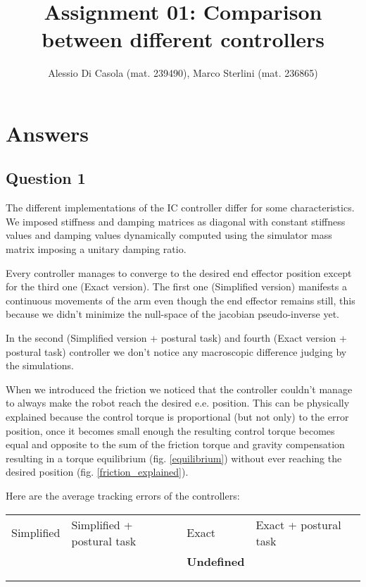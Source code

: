 \documentclass[10pt]{article}
\begin{document}
\date{}
\author{Alessio Di Casola (mat. 239490), Marco Sterlini (mat. 236865)}

\title{Assignment 01: Comparison between different controllers}

\maketitle

\section{Answers}
\subsection{Question 1}
The different implementations of the IC controller differ for some characteristics.
We imposed stiffness and damping matrices as diagonal with constant stiffness values and damping values dynamically computed using the simulator mass matrix imposing a unitary damping ratio. 

Every controller manages to converge to the desired end effector position except for the third one (Exact version). The first one (Simplified version) manifests a continuous movements of the arm even though the end effector remains still, this because we didn't minimize the null-space of the jacobian pseudo-inverse yet.

In the second (Simplified version + postural task) and fourth (Exact version + postural task) controller we don't notice any macroscopic difference judging by the simulations.

When we introduced the friction we noticed that the controller couldn't manage to always make the robot reach the desired e.e. position. This can be physically explained because the control torque is proportional (but not only) to the error position, once it becomes small enough the resulting control torque becomes equal and opposite to the sum of the friction torque and gravity compensation resulting in a torque equilibrium (fig. \ref{equilibrium}) without ever reaching the desired position (fig. \ref{friction_explained}).

Here are the average tracking errors of the controllers:

\begin{table}[h]
    \begin{tabular}{lllll}
    \cline{1-4}
    \multicolumn{1}{|l|}{Simplified} & \multicolumn{1}{l|}{Simplified + postural task} & \multicolumn{1}{l|}{Exact} & \multicolumn{1}{l|}{Exact + postural task} &  \\ \cline{1-4}
    \multicolumn{1}{|l|}{} & \multicolumn{1}{l|}{} & \multicolumn{1}{l|}{\textbf{Undefined}} & \multicolumn{1}{l|}{} &  \\ \cline{1-4}
                           &                       &                       &                       &  \\
                           &                       &                       &                       & 
    \end{tabular}
\end{table}
\end{document}

